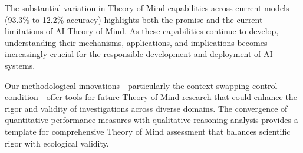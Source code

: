 The substantial variation in Theory of Mind capabilities across current models (93.3\% to 12.2\% accuracy) highlights both the promise and the current limitations of AI Theory of Mind. As these capabilities continue to develop, understanding their mechanisms, applications, and implications becomes increasingly crucial for the responsible development and deployment of AI systems.

Our methodological innovations—particularly the context swapping control condition—offer tools for future Theory of Mind research that could enhance the rigor and validity of investigations across diverse domains. The convergence of quantitative performance measures with qualitative reasoning analysis provides a template for comprehensive Theory of Mind assessment that balances scientific rigor with ecological validity. 